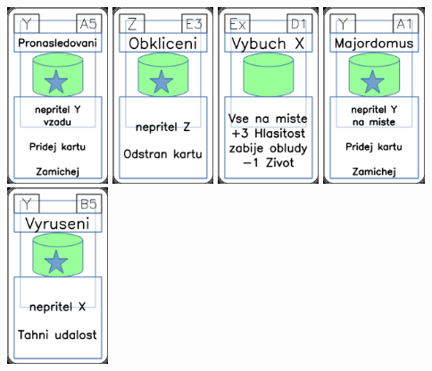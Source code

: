 \documentclass[a4paper]{article}
\begin{document}
	\includegraphics[width=3.0cm]{img-5_34}
	\includegraphics[width=3.0cm]{img-5_52}
	\includegraphics[width=3.0cm]{img-4_15}
	\includegraphics[width=3.0cm]{img-5_30}
	\includegraphics[width=3.0cm]{img-5_39}
\end{document}
